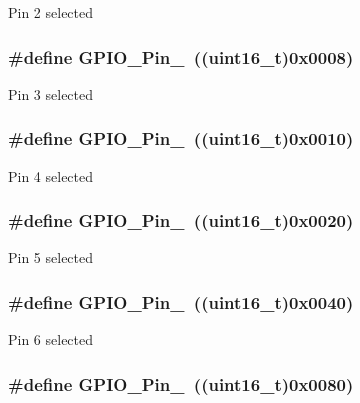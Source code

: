 \label{group__GPIO__pins__define_gabdf6630324b2f99360537a310687187c}
Pin 2 selected \hypertarget{group__GPIO__pins__define_ga763c6544859dbe28cd3f8ad820045556}{
\subsubsection[{GPIO\_\-Pin\_\-3}]{\setlength{\rightskip}{0pt plus 5cm}\#define GPIO\_\-Pin\_~((uint16\_\-t)0x0008)}}
\label{group__GPIO__pins__define_ga763c6544859dbe28cd3f8ad820045556}
Pin 3 selected \hypertarget{group__GPIO__pins__define_gacbf04d09b954606cdcc55eb2e81780e3}{
\subsubsection[{GPIO\_\-Pin\_\-4}]{\setlength{\rightskip}{0pt plus 5cm}\#define GPIO\_\-Pin\_~((uint16\_\-t)0x0010)}}
\label{group__GPIO__pins__define_gacbf04d09b954606cdcc55eb2e81780e3}
Pin 4 selected \hypertarget{group__GPIO__pins__define_ga32dbe930f52ce5ab60190c65e9dc741e}{
\subsubsection[{GPIO\_\-Pin\_\-5}]{\setlength{\rightskip}{0pt plus 5cm}\#define GPIO\_\-Pin\_~((uint16\_\-t)0x0020)}}
\label{group__GPIO__pins__define_ga32dbe930f52ce5ab60190c65e9dc741e}
Pin 5 selected \hypertarget{group__GPIO__pins__define_gaf047899d873f27c2db9f50b342e35a58}{
\subsubsection[{GPIO\_\-Pin\_\-6}]{\setlength{\rightskip}{0pt plus 5cm}\#define GPIO\_\-Pin\_~((uint16\_\-t)0x0040)}}
\label{group__GPIO__pins__define_gaf047899d873f27c2db9f50b342e35a58}
Pin 6 selected \hypertarget{group__GPIO__pins__define_ga7346b6ce5507bd28a7a79e7dcc816c08}{
\subsubsection[{GPIO\_\-Pin\_\-7}]{\setlength{\rightskip}{0pt plus 5cm}\#define GPIO\_\-Pin\_~((uint16\_\-t)0x0080)}}
